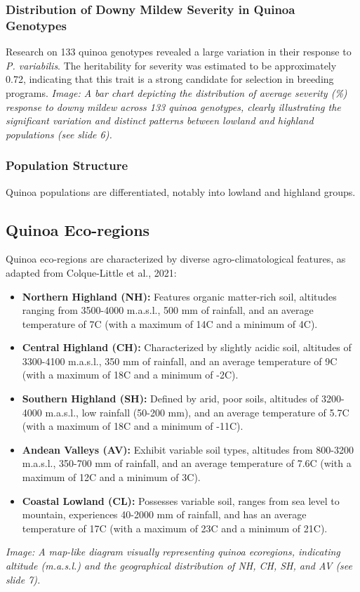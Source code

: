 \subsubsection*{Distribution of Downy Mildew Severity in Quinoa Genotypes} 
Research on 133 quinoa genotypes revealed a large variation in their response to \textit{P. variabilis}. The heritability for severity was estimated to be approximately 0.72, indicating that this trait is a strong candidate for selection in breeding programs. \textit{Image: A bar chart depicting the distribution of average severity (\%) response to downy mildew across 133 quinoa genotypes, clearly illustrating the significant variation and distinct patterns between lowland and highland populations (see slide 6).}

\subsubsection*{Population Structure} 
Quinoa populations are differentiated, notably into lowland and highland groups.

\subsection{Quinoa Eco-regions} 
Quinoa eco-regions are characterized by diverse agro-climatological features, as adapted from Colque-Little et al., 2021: 
\begin{itemize} 
    \item \textbf{Northern Highland (NH):} Features organic matter-rich soil, altitudes ranging from 3500-4000 m.a.s.l., 500 mm of rainfall, and an average temperature of 7\textdegree C (with a maximum of 14\textdegree C and a minimum of 4\textdegree C). 
    \item \textbf{Central Highland (CH):} Characterized by slightly acidic soil, altitudes of 3300-4100 m.a.s.l., 350 mm of rainfall, and an average temperature of 9\textdegree C (with a maximum of 18\textdegree C and a minimum of -2\textdegree C). 
    \item \textbf{Southern Highland (SH):} Defined by arid, poor soils, altitudes of 3200-4000 m.a.s.l., low rainfall (50-200 mm), and an average temperature of 5.7\textdegree C (with a maximum of 18\textdegree C and a minimum of -11\textdegree C). 
    \item \textbf{Andean Valleys (AV):} Exhibit variable soil types, altitudes from 800-3200 m.a.s.l., 350-700 mm of rainfall, and an average temperature of 7.6\textdegree C (with a maximum of 12\textdegree C and a minimum of 3\textdegree C). 
    \item \textbf{Coastal Lowland (CL):} Possesses variable soil, ranges from sea level to mountain, experiences 40-2000 mm of rainfall, and has an average temperature of 17\textdegree C (with a maximum of 23\textdegree C and a minimum of 21\textdegree C). 
\end{itemize} 
\textit{Image: A map-like diagram visually representing quinoa ecoregions, indicating altitude (m.a.s.l.) and the geographical distribution of NH, CH, SH, and AV (see slide 7).}

